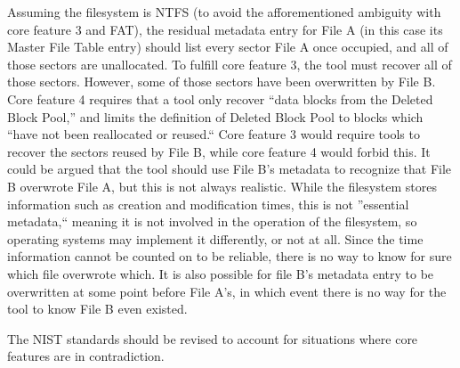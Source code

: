 Assuming the filesystem is NTFS (to avoid the afforementioned ambiguity with core feature 3 and FAT), the residual metadata entry for File A (in this case its Master File Table entry) should list every sector File A once occupied, and all of those sectors are unallocated. To fulfill core feature 3, the tool must recover all of those sectors. However, some of those sectors have been overwritten by File B. Core feature 4 requires that a tool only recover ``data blocks from the Deleted Block Pool,''\cite{meta:dfr:standards} and limits the definition of Deleted Block Pool to blocks which ``have not been reallocated or reused.``\cite{meta:dfr:standards}
Core feature 3 would require tools to recover the sectors reused by File B, while core feature 4 would forbid this. It could be argued that the tool should use File B's metadata to recognize that File B overwrote File A, but this is not always realistic. While the filesystem stores information such as creation and modification times, this is not ''essential metadata,`` meaning it is not involved in the operation of the filesystem, so operating systems may implement it differently, or not at all. %
Since the time information cannot be counted on to be reliable, there is no way to know for sure which file overwrote which. It is also possible for file B's metadata entry to be overwritten at some point before File A's, in which event there is no way for the tool to know File B even existed.

The NIST standards should be revised to account for situations where core features are in contradiction.
